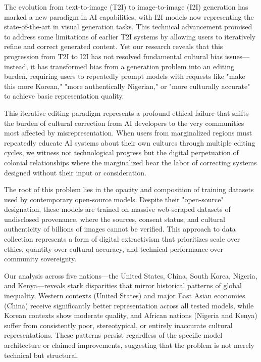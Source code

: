 \documentclass{article}
\begin{document}
The evolution from text-to-image (T2I) to image-to-image (I2I) generation has marked a new paradigm in AI capabilities, with I2I models now representing the state-of-the-art in visual generation tasks. This technical advancement promised to address some limitations of earlier T2I systems by allowing users to iteratively refine and correct generated content. Yet our research reveals that this progression from T2I to I2I has not resolved fundamental cultural bias issues—instead, it has transformed bias from a generation problem into an editing burden, requiring users to repeatedly prompt models with requests like "make this more Korean," "more authentically Nigerian," or "more culturally accurate" to achieve basic representation quality.

This iterative editing paradigm represents a profound ethical failure that shifts the burden of cultural correction from AI developers to the very communities most affected by misrepresentation. When users from marginalized regions must repeatedly educate AI systems about their own cultures through multiple editing cycles, we witness not technological progress but the digital perpetuation of colonial relationships where the marginalized bear the labor of correcting systems designed without their input or consideration.

The root of this problem lies in the opacity and composition of training datasets used by contemporary open-source models. Despite their "open-source" designation, these models are trained on massive web-scraped datasets of undisclosed provenance, where the sources, consent status, and cultural authenticity of billions of images cannot be verified. This approach to data collection represents a form of digital extractivism that prioritizes scale over ethics, quantity over cultural accuracy, and technical performance over community sovereignty.

Our analysis across five nations—the United States, China, South Korea, Nigeria, and Kenya—reveals stark disparities that mirror historical patterns of global inequality. Western contexts (United States) and major East Asian economies (China) receive significantly better representation across all tested models, while Korean contexts show moderate quality, and African nations (Nigeria and Kenya) suffer from consistently poor, stereotypical, or entirely inaccurate cultural representations. These patterns persist regardless of the specific model architecture or claimed improvements, suggesting that the problem is not merely technical but structural.
\end{document}
